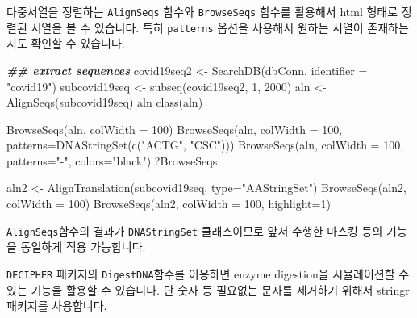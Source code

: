 \documentclass[
]{book}
\newenvironment{Shaded}{\begin{snugshade}}{\end{snugshade}}
\newcommand{\AttributeTok}[1]{\textcolor[rgb]{0.77,0.63,0.00}{#1}}
\newcommand{\DecValTok}[1]{\textcolor[rgb]{0.00,0.00,0.81}{#1}}
\newcommand{\DocumentationTok}[1]{\textcolor[rgb]{0.56,0.35,0.01}{\textbf{\textit{#1}}}}
\newcommand{\FunctionTok}[1]{\textcolor[rgb]{0.00,0.00,0.00}{#1}}
\newcommand{\NormalTok}[1]{#1}
\newcommand{\OtherTok}[1]{\textcolor[rgb]{0.56,0.35,0.01}{#1}}
\newcommand{\StringTok}[1]{\textcolor[rgb]{0.31,0.60,0.02}{#1}}
\begin{document}
다중서열을 정렬하는 \texttt{AlignSeqs} 함수와 \texttt{BrowseSeqs} 함수를 활용해서 html 형태로 정렬된 서열을 볼 수 있습니다. 특히 \texttt{patterns} 옵션을 사용해서 원하는 서열이 존재하는지도 확인할 수 있습니다.

\begin{Shaded}
\begin{Highlighting}[]

\DocumentationTok{\#\# extract sequences}
\NormalTok{covid19seq2 }\OtherTok{\textless{}{-}} \FunctionTok{SearchDB}\NormalTok{(dbConn, }\AttributeTok{identifier =} \StringTok{"covid19"}\NormalTok{)}
\NormalTok{subcovid19seq }\OtherTok{\textless{}{-}} \FunctionTok{subseq}\NormalTok{(covid19seq2, }\DecValTok{1}\NormalTok{, }\DecValTok{2000}\NormalTok{)}
\NormalTok{aln }\OtherTok{\textless{}{-}} \FunctionTok{AlignSeqs}\NormalTok{(subcovid19seq)}
\NormalTok{aln}
\FunctionTok{class}\NormalTok{(aln)}

\FunctionTok{BrowseSeqs}\NormalTok{(aln, }\AttributeTok{colWidth =} \DecValTok{100}\NormalTok{)}
\FunctionTok{BrowseSeqs}\NormalTok{(aln, }\AttributeTok{colWidth =} \DecValTok{100}\NormalTok{, }\AttributeTok{patterns=}\FunctionTok{DNAStringSet}\NormalTok{(}\FunctionTok{c}\NormalTok{(}\StringTok{"ACTG"}\NormalTok{, }\StringTok{"CSC"}\NormalTok{)))}
\FunctionTok{BrowseSeqs}\NormalTok{(aln, }\AttributeTok{colWidth =} \DecValTok{100}\NormalTok{, }\AttributeTok{patterns=}\StringTok{"{-}"}\NormalTok{, }\AttributeTok{colors=}\StringTok{"black"}\NormalTok{)}
\NormalTok{?BrowseSeqs}

\NormalTok{aln2 }\OtherTok{\textless{}{-}} \FunctionTok{AlignTranslation}\NormalTok{(subcovid19seq, }\AttributeTok{type=}\StringTok{"AAStringSet"}\NormalTok{)}
\FunctionTok{BrowseSeqs}\NormalTok{(aln2, }\AttributeTok{colWidth =} \DecValTok{100}\NormalTok{)}
\FunctionTok{BrowseSeqs}\NormalTok{(aln2, }\AttributeTok{colWidth =} \DecValTok{100}\NormalTok{, }\AttributeTok{highlight=}\DecValTok{1}\NormalTok{)}
\end{Highlighting}
\end{Shaded}

\texttt{AlignSeqs}함수의 결과가 \texttt{DNAStringSet} 클래스이므로 앞서 수행한 마스킹 등의 기능을 동일하게 적용 가능합니다.

\texttt{DECIPHER} 패키지의 \texttt{DigestDNA}함수를 이용하면 enzyme digestion을 시뮬레이션할 수 있는 기능을 활용할 수 있습니다. 단 숫자 등 필요없는 문자를 제거하기 위해서 stringr 패키지를 사용합니다.
\end{document}
